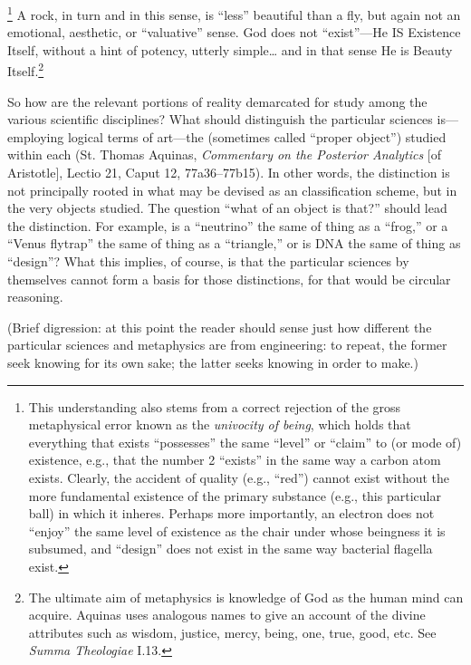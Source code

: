 \footnote{This understanding also stems from a correct rejection of the gross metaphysical error known as the \textit{univocity of being}, which holds that everything that exists ``possesses'' the same ``level'' or ``claim'' to (or mode of) existence, e.g., that the number 2 ``exists'' in the same way a carbon atom exists. Clearly, the accident of quality (e.g., ``red'') cannot exist without the more fundamental existence of the primary substance (e.g., this particular ball) in which it inheres. Perhaps more importantly, an electron does not ``enjoy'' the same level of existence as the chair under whose beingness it is subsumed, and ``design'' does not exist in the same way bacterial flagella exist.} A rock, in turn and in this sense, is ``less'' beautiful than a fly, but again not an emotional, aesthetic, or ``valuative'' sense. God does not ``exist''---He IS Existence Itself, without a hint of potency, utterly simple\ldots{} and in that sense He is Beauty Itself.\footnote{The ultimate aim of metaphysics is knowledge of God as the human mind can acquire. Aquinas uses analogous names to give an account of the divine attributes such as wisdom, justice, mercy, being, one, true, good, etc. See \textit{Summa Theologiae} I.13.}

So how are the relevant portions of reality demarcated for study among the various scientific disciplines? What should distinguish the particular sciences is---employing logical terms of art---the  (sometimes called ``proper object'') studied within each (St. Thomas Aquinas, \textit{Commentary on the Posterior Analytics} [of Aristotle], Lectio 21, Caput 12, 77a36--77b15). In other words, the distinction is not principally rooted in what may be devised as an  classification scheme, but in the very objects studied. The question ``what  of an object is that?'' should lead the distinction. For example, is a ``neutrino'' the same  of thing as a ``frog,'' or a ``Venus flytrap'' the same  of thing as a ``triangle,'' or is DNA the same  of thing as ``design''? What this implies, of course, is that the particular sciences by themselves cannot form a basis for those distinctions, for that would be circular reasoning.

(Brief digression: at this point the reader should sense just how different the particular sciences and metaphysics are from engineering: to repeat, the former seek knowing for its own sake; the latter seeks knowing in order to make.)

